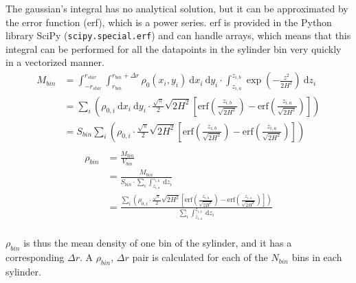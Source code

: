 \documentclass[a4paper, 12pt, english, titlepage]{article}
\newcommand{\erf}[1]{\textrm{erf}\left(#1\right)} %
\newcommand{\D}[1]{\ \mathrm{d}#1} %
\begin{document}
        The gaussian's integral has no analytical solution, but it can be approximated by the error function (erf), which is a power series. erf is provided in the Python library SciPy (\texttt{scipy.special.erf}) and can handle arrays, which means that this integral can be performed for all the datapoints in the sylinder bin very quickly in a vectorized manner.
        \begin{align*}
            M_{bin}
                &= \int_{-r_{star}}^{r_{star}}\int_{r_{bin}}^{r_{bin} + \Delta r} 
                    \rho_0(x_i,y_i) \D{x_i}\D{y_i} \cdot
                    \int_{z_{i,a}}^{z_{i,b}} \exp\left(- \frac{z^2}{2H^2}\right) \D{z_i} \\
                &= \sum_i \left(
                        \rho_{0,i} \D{x_i}\D{y_i} \cdot
                        \frac{\sqrt{\pi}}{2} \sqrt{2H^2}
                        \left[
                            \erf{\frac{z_{i,b}}{\sqrt{2H^2}}} -
                            \erf{\frac{z_{i,a}}{\sqrt{2H^2}}}
                        \right]
                    \right) \\
                &= S_{bin} \sum_i \left(
                        \rho_{0,i} \cdot
                        \frac{\sqrt{\pi}}{2} \sqrt{2H^2}
                        \left[
                            \erf{\frac{z_{i,b}}{\sqrt{2H^2}}} -
                            \erf{\frac{z_{i,a}}{\sqrt{2H^2}}}
                        \right]
                    \right) \\
        \end{align*}
        \begin{align*}
            \rho_{bin} &= \frac{M_{bin}}{V_{bin}} \\
                &= \frac{M_{bin}}{S_{bin} \cdot \sum_i \int_{z_{i,a}}^{z_{i,b}} \D{z_i}} \\
                &= \frac{
                    \sum_i \left(
                        \rho_{0,i} \cdot
                        \frac{\sqrt{\pi}}{2} \sqrt{2H^2}
                        \left[
                            \erf{\frac{z_{i,b}}{\sqrt{2H^2}}} -
                            \erf{\frac{z_{i,a}}{\sqrt{2H^2}}}
                        \right]
                    \right)
                }{\sum_i \int_{z_{i,a}}^{z_{i,b}} \D{z_i}} \\
        \end{align*}

        $\rho_{bin}$ is thus the mean density of one bin of the sylinder, and it has a corresponding $\Delta r$. A $\rho_{bin}$, $\Delta r$ pair is calculated for each of the $N_{bin}$ bins in each sylinder.
\end{document}
